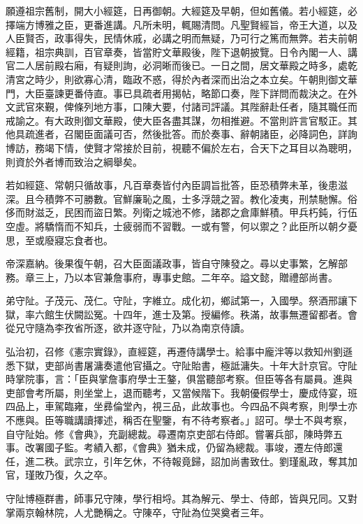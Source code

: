 \begin{pinyinscope}
願遵祖宗舊制，開大小經筵，日再御朝。大經筵及早朝，但如舊儀。若小經筵，必擇端方博雅之臣，更番進講。凡所未明，輒賜清問。凡聖賢經旨，帝王大道，以及人臣賢否，政事得失，民情休戚，必講之明而無疑，乃可行之篤而無弊。若夫前朝經籍，祖宗典訓，百官章奏，皆當貯文華殿後，陛下退朝披覽。日令內閣一人、講官二人居前殿右廂，有疑則詢，必洞晰而後已。一日之間，居文華殿之時多，處乾清宮之時少，則欲寡心清，臨政不惑，得於內者深而出治之本立矣。午朝則御文華門，大臣臺諫更番侍直。事已具疏者用揭帖，略節口奏，陛下詳問而裁決之。在外文武官來覲，俾條列地方事，口陳大要，付諸司評議。其陛辭赴任者，隨其職任而戒諭之。有大政則御文華殿，使大臣各盡其謀，勿相推避。不當則許言官駁正。其他具疏進者，召閣臣面議可否，然後批答。而於奏事、辭朝諸臣，必降詞色，詳詢博訪，務竭下情，使賢才常接於目前，視聽不偏於左右，合天下之耳目以為聰明，則資於外者博而致治之綱舉矣。

若如經筵、常朝只循故事，凡百章奏皆付內臣調旨批答，臣恐積弊未革，後患滋深。且今積弊不可勝數。官鮮廉恥之風，士多浮競之習。教化凌夷，刑禁馳懈。俗侈而財滋乏，民困而盜日繁。列衛之城池不修，諸郡之倉庫鮮積。甲兵朽鈍，行伍空虛。將驕惰而不知兵，士疲弱而不習戰。一或有警，何以禦之？此臣所以朝夕憂思，至或廢寢忘食者也。

帝深嘉納。後果復午朝，召大臣面議政事，皆自守陳發之。尋以史事繁，乞解部務。章三上，乃以本官兼詹事府，專事史館。二年卒。謚文懿，贈禮部尚書。

弟守阯。子茂元、茂仁。守阯，字維立。成化初，鄉試第一，入國學。祭酒邢讓下獄，率六館生伏闕訟冤。十四年，進士及第。授編修。秩滿，故事無遷留都者。會從兄守隨為李孜省所逐，欲并逐守阯，乃以為南京侍讀。

弘治初，召修《憲宗實錄》，直經筵，再遷侍講學士。給事中龐泮等以救知州劉遜悉下獄，吏部尚書屠滽奏遣他官攝之。守阯貽書，極詆滽失。十年大計京官。守阯時掌院事，言：「臣與掌詹事府學士王鏊，俱當聽部考察。但臣等各有屬員。進與吏部會考所屬，則坐堂上，退而聽考，又當候階下。我朝優假學士，慶成侍宴，班四品上，車駕臨雍，坐彞倫堂內，視三品，此故事也。今四品不與考察，則學士亦不應與。臣等職講讀擇述，稱否在聖鑒，有不待考察者。」詔可。學士不與考察，自守阯始。修《會典》，充副總裁。尋遷南京吏部右侍郎。嘗署兵部，陳時弊五事。改署國子監。考績入都，《會典》猶未成，仍留為總裁。事竣，遷左侍郎還任，進二秩。武宗立，引年乞休，不待報竟歸，詔加尚書致仕。劉瑾亂政，奪其加官，瑾敗乃復，久之卒。

守阯博極群書，師事兄守陳，學行相埒。其為解元、學士、侍郎，皆與兄同。又對掌兩京翰林院，人尤艷稱之。守陳卒，守阯為位哭奠者三年。


\end{pinyinscope}
